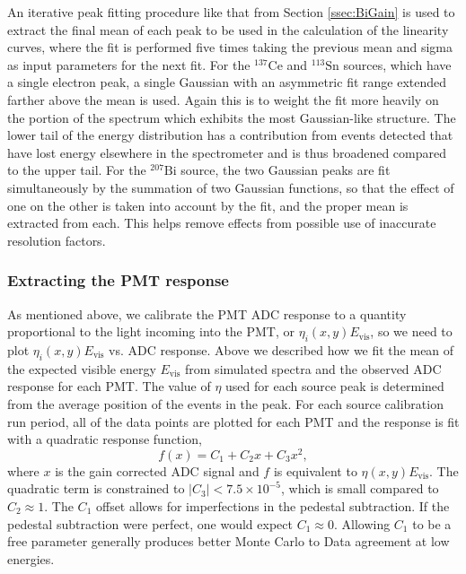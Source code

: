 An iterative peak fitting procedure like that from Section \ref{ssec:BiGain} is used to extract the final mean
of each peak to be used in the calculation of the linearity curves,
where the fit is performed five times taking the previous mean and sigma as input parameters
for the next fit. For the  $^{137}\mathrm{Ce}$ and $^{113}\mathrm{Sn}$ sources, which have a single
electron peak, a single Gaussian with an asymmetric fit range extended farther above the mean is used. Again this is to
weight the fit more heavily on the portion of the spectrum which exhibits the most Gaussian-like structure. The
lower tail of the energy distribution has a contribution from events detected that have lost energy elsewhere
in the spectrometer and is thus broadened compared to the upper tail. For the $^{207}\mathrm{Bi}$ source,
the two Gaussian peaks are fit simultaneously by
the summation of two Gaussian functions, so that the effect of one on the other is taken into account by the fit, and
the proper mean is extracted from each. This helps remove effects from possible use of inaccurate
resolution factors. %

\subsubsection{Extracting the PMT response}

As mentioned above, we calibrate the PMT ADC response to a quantity proportional to the light incoming into
the PMT, or $\eta_i(x,y)E_{\mathrm{vis}}$, so we need to plot $\eta_i(x,y)E_{\mathrm{vis}}$ vs. ADC response.
Above we described how we fit the mean of the expected visible energy
$E_{\mathrm{vis}}$ from simulated spectra and the observed ADC response for each PMT.
The value of $\eta$ used for each source peak is determined from the average position of the events in the peak.
For each source calibration run period, all of the data points are plotted for each PMT and the response
is fit with a quadratic response function,
%
\begin{equation} \label{eq:linCurveParam}
  f(x) = C_1 + C_2x+ C_3x^2,
\end{equation}
%
where $x$ is the gain corrected ADC signal and $f$ is equivalent to $\eta(x,y)E_{\mathrm{vis}}$. The quadratic term
is constrained to $|C_3|<7.5\times10^{-5}$, which is small compared to $C_2\approx1$. The $C_1$ offset allows
for imperfections in the pedestal subtraction. If the pedestal subtraction were perfect, one would expect
$C_1\approx0$. Allowing $C_1$ to be a free parameter generally produces better Monte Carlo to Data agreement
at low energies.

